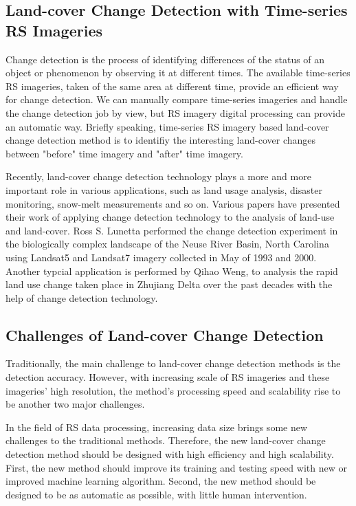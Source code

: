 \documentclass{elsart}
\begin{document}
\subsection{Land-cover Change Detection with Time-series RS Imageries}
Change detection is the process of identifying differences of the status of an object or phenomenon by observing it at different times\cite{SINGH1989}.
The available time-series RS imageries, taken of the same area at different time, provide an efficient way for change detection.
We can manually compare time-series imageries and handle the change detection job by view, but RS imagery digital processing can provide an automatic way.
Briefly speaking, time-series RS imagery based land-cover change detection method is to identifiy the interesting land-cover changes between "before" time imagery and "after" time imagery.
\par

Recently, land-cover change detection technology plays a more and more important role in various applications, such as land usage analysis, disaster monitoring, snow-melt measurements and so on. 
Various papers\cite{Weng2002}\cite{Read2002}\cite{Lunetta2002} have presented their work of applying change detection technology to the analysis of land-use and land-cover. 
Ross S. Lunetta\cite{Lunetta2002} performed the change detection experiment in the biologically complex landscape of the Neuse River Basin, North Carolina using Landsat5 and Landsat7 imagery collected in May of 1993 and 2000. 
Another typcial application is performed by Qihao Weng\cite{Weng2002}, to analysis the rapid land use change taken place in Zhujiang Delta over the past decades with the help of change detection technology.

\subsection{Challenges of Land-cover Change Detection}
Traditionally, the main challenge to land-cover change detection methods is the detection accuracy.
However, with increasing scale of RS imageries and these imageries' high resolution, the method's processing speed and scalability rise to be another two major challenges. 
\par 
In the field of RS data processing, increasing data size brings some new challenges to the traditional methods. 
Therefore, the new land-cover change detection method should be designed with high efficiency and high scalability.
First, the new method should improve its training and testing speed with new or improved machine learning algorithm. 
Second, the new method should be designed to be as automatic as possible, with little human intervention. 
\end{document}
